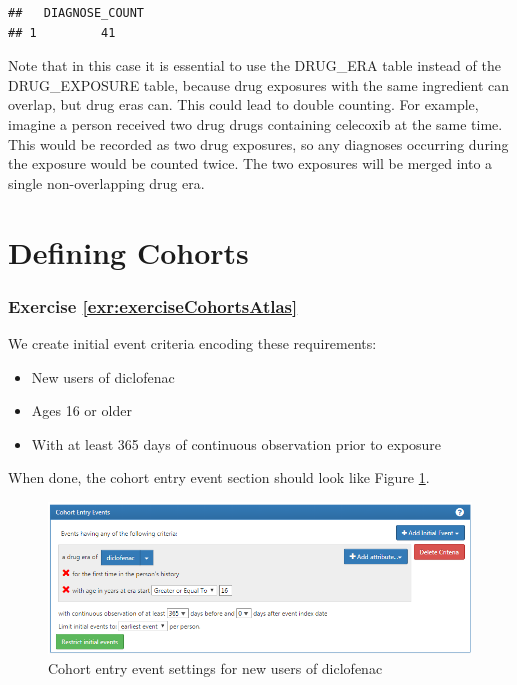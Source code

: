 \documentclass[11pt]{book}
\providecommand{\tightlist}{%
  \setlength{\itemsep}{0pt}\setlength{\parskip}{0pt}}
\theoremstyle{definition}
\theoremstyle{definition}
\theoremstyle{definition}
\theoremstyle{remark}
\begin{document}
\begin{verbatim}
##   DIAGNOSE_COUNT
## 1         41
\end{verbatim}

Note that in this case it is essential to use the DRUG\_ERA table
instead of the DRUG\_EXPOSURE table, because drug exposures with the
same ingredient can overlap, but drug eras can. This could lead to
double counting. For example, imagine a person received two drug drugs
containing celecoxib at the same time. This would be recorded as two
drug exposures, so any diagnoses occurring during the exposure would be
counted twice. The two exposures will be merged into a single
non-overlapping drug era.

\section{Defining Cohorts}\label{Cohortsanswers}

\subsubsection*{Exercise
\ref{exr:exerciseCohortsAtlas}}\label{exercise-refexrexercisecohortsatlas}

We create initial event criteria encoding these requirements:

\begin{itemize}
\tightlist
\item
  New users of diclofenac
\item
  Ages 16 or older
\item
  With at least 365 days of continuous observation prior to exposure
\end{itemize}

When done, the cohort entry event section should look like Figure
\ref{fig:cohortsAtlasInitialEvents}.

\begin{figure}

{\centering \includegraphics[width=1\linewidth]{images/SuggestedAnswers/cohortsAtlasInitialEvents} 

}

\caption{Cohort entry event settings for new users of diclofenac}\label{fig:cohortsAtlasInitialEvents}
\end{figure}
\end{document}
